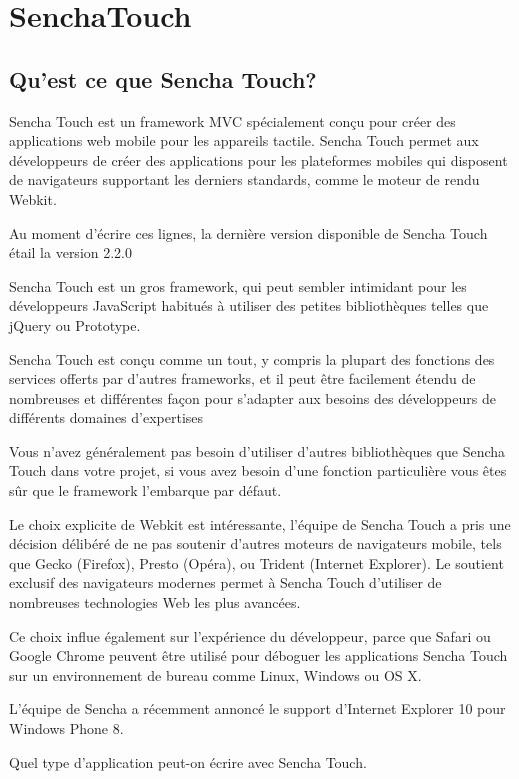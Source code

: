 \section{SenchaTouch}
\label{ch:senchaTouch}

\subsection{Qu’est ce que Sencha Touch?}

Sencha Touch est un framework MVC spécialement conçu pour créer des applications web mobile pour les appareils tactile. Sencha Touch permet aux développeurs de créer des applications pour les plateformes mobiles qui disposent de navigateurs supportant les derniers standards, comme le moteur de rendu Webkit.

Au moment d’écrire ces lignes, la dernière version disponible de Sencha Touch étail la version 2.2.0

Sencha Touch est un gros framework, qui peut sembler intimidant pour les développeurs JavaScript habitués à utiliser des petites bibliothèques telles que jQuery ou Prototype.

Sencha Touch est conçu comme un tout, y compris la plupart des fonctions des services offerts par d’autres frameworks, et il peut être facilement étendu de nombreuses et différentes façon pour s’adapter aux besoins des développeurs de différents domaines d’expertises

Vous n’avez généralement pas besoin d’utiliser d’autres bibliothèques que Sencha Touch dans votre projet, si vous avez besoin d’une fonction particulière vous êtes sûr que le framework l’embarque par défaut.

Le choix explicite de Webkit est intéressante, l’équipe de Sencha Touch a pris une décision délibéré de ne pas soutenir d’autres moteurs de navigateurs mobile, tels que Gecko (Firefox), Presto (Opéra), ou Trident (Internet Explorer). Le soutient exclusif des navigateurs modernes permet à Sencha Touch d’utiliser de nombreuses technologies Web les plus avancées.

Ce choix influe également sur l’expérience du développeur, parce que Safari ou Google Chrome peuvent être utilisé pour déboguer les applications Sencha Touch sur un environnement de bureau comme Linux, Windows ou OS X.

L’équipe de Sencha a récemment annoncé le support d'Internet Explorer 10 pour Windows Phone 8.

Quel type d’application peut-on écrire avec Sencha Touch.

